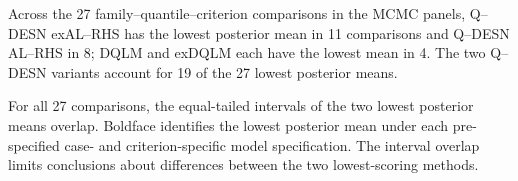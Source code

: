 Across the 27 family--quantile--criterion comparisons in the MCMC panels, Q--DESN exAL--RHS has the lowest posterior mean in 11 comparisons and Q--DESN AL--RHS in 8; DQLM and exDQLM each have the lowest mean in 4. The two Q--DESN variants account for 19 of the 27 lowest posterior means.

For all 27 comparisons, the equal-tailed intervals of the two lowest posterior means overlap. Boldface identifies the lowest posterior mean under each pre-specified case- and criterion-specific model specification. The interval overlap limits conclusions about differences between the two lowest-scoring methods.
